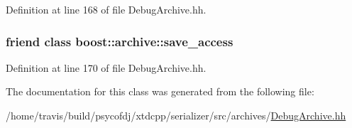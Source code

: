Definition at line 168 of file Debug\-Archive.\-hh.

\hypertarget{classxtd_1_1serializer_1_1DebugTextIArchive_aaca003bb8a4fc59424e4025130da4edd}{
\subsubsection[{boost\-::archive\-::save\-\_\-access}]{\setlength{\rightskip}{0pt plus 5cm}friend class boost\-::archive\-::save\-\_\-access\hspace{0.3cm}{\ttfamily [friend]}}}\label{classxtd_1_1serializer_1_1DebugTextIArchive_aaca003bb8a4fc59424e4025130da4edd}


Definition at line 170 of file Debug\-Archive.\-hh.



The documentation for this class was generated from the following file\-:\begin{DoxyCompactItemize}
\item 
/home/travis/build/psycofdj/xtdcpp/serializer/src/archives/\hyperlink{DebugArchive_8hh}{Debug\-Archive.\-hh}\end{DoxyCompactItemize}
